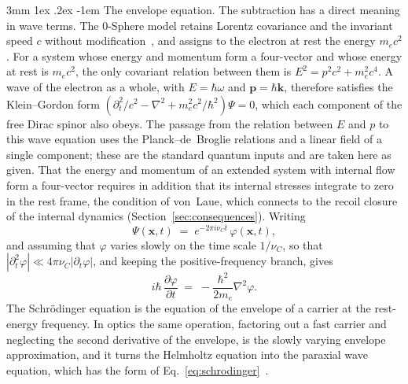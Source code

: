 \documentclass[%
 reprint, amsmath,amssymb, aps, prb, ]{revtex4-2}
\makeatletter
\numberwithin{equation}{section}
\renewcommand\paragraph{%
  \@startsection{paragraph}{4}{\z@}%
    {3mm \@plus 1ex \@minus .2ex}%
    {-1em}%
    {\normalfont\normalsize\itshape}}
\makeatother
\begin{document}
\paragraph{The envelope equation.} The subtraction has a direct meaning in wave terms. The 0-Sphere model retains Lorentz covariance and the invariant speed $c$ without modification~\cite{H51, H66}, and assigns to the electron at rest the energy $m_ec^2$. For a system whose energy and momentum form a four-vector and whose energy at rest is $m_ec^2$, the only covariant relation between them is $E^2 = p^2c^2 + m_e^2c^4$. A wave of the electron as a whole, with $E = \hbar\omega$ and $\bm{p} = \hbar\bm{k}$, therefore satisfies the Klein--Gordon form $(\partial_t^2/c^2 - \nabla^2 + m_e^2c^2/\hbar^2)\Psi = 0$, which each component of the free Dirac spinor also obeys. The passage from the relation between $E$ and $p$ to this wave equation uses the Planck--de~Broglie relations and a linear field of a single component; these are the standard quantum inputs and are taken here as given. That the energy and momentum of an extended system with internal flow form a four-vector requires in addition that its internal stresses integrate to zero in the rest frame, the condition of von~Laue, which connects to the recoil closure of the internal dynamics (Section~\ref{sec:consequences}). Writing
\begin{equation}
\Psi(\bm{x},t) \;=\; e^{-2\pi i\nu_C t}\,\varphi(\bm{x},t),
\label{eq:carrier}
\end{equation}
and assuming that $\varphi$ varies slowly on the time scale $1/\nu_C$, so that $|\partial_t^2\varphi| \ll 4\pi\nu_C|\partial_t\varphi|$, and keeping the positive-frequency branch, gives
\begin{equation}
i\hbar\,\frac{\partial\varphi}{\partial t} \;=\; -\frac{\hbar^2}{2m_e}\nabla^2\varphi.
\label{eq:schrodinger}
\end{equation}
The Schr\"odinger equation is the equation of the envelope of a carrier at the rest-energy frequency. In optics the same operation, factoring out a fast carrier and neglecting the second derivative of the envelope, is the slowly varying envelope approximation, and it turns the Helmholtz equation into the paraxial wave equation, which has the form of Eq.~\eqref{eq:schrodinger}~\cite{Siegman1986}.
\end{document}
